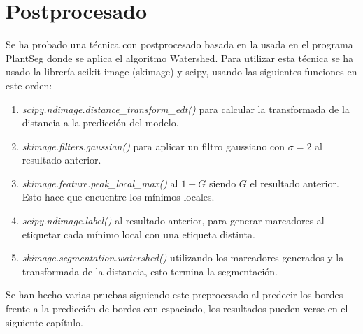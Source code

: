\section{Postprocesado}\label{sec:data_loading_processing}

Se ha probado una técnica con postprocesado basada en la usada en el programa PlantSeg \cite{Wolny2020} donde se aplica el algoritmo Watershed. Para utilizar esta técnica se ha usado la librería scikit-image (skimage) y scipy, usando las siguientes funciones en este orden:
\begin{enumerate}
\item \textit{scipy.ndimage.distance\_transform\_edt()} para calcular la transformada de la distancia a la predicción del modelo.
\item \textit{skimage.filters.gaussian()} para aplicar un filtro gaussiano con $\sigma = 2$ al resultado anterior.
\item \textit{skimage.feature.peak\_local\_max()} al $1 - G$ siendo $G$ el resultado anterior. Esto hace que encuentre los mínimos locales.
\item \textit{scipy.ndimage.label()} al resultado anterior, para generar marcadores al etiquetar cada mínimo local con una etiqueta distinta.
\item \textit{skimage.segmentation.watershed()} utilizando los marcadores generados y la transformada de la distancia, esto termina la segmentación.
\end{enumerate}

Se han hecho varias pruebas siguiendo este preprocesado al predecir los bordes frente a la predicción de bordes con espaciado, los resultados pueden verse en el siguiente capítulo.